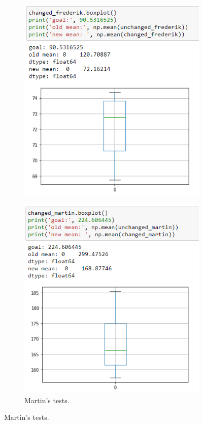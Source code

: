 \documentclass[parskip=full]{scrartcl}
\begin{document}
\begin{figure}[!hb]
\begin{subfigure}[b]{0.35\textwidth}
        \includegraphics[width=\textwidth]{frederik_changed.PNG}
    \end{subfigure}
    \begin{subfigure}[b]{0.35\textwidth}
        \caption{Martin's tests.}
        \includegraphics[width=\textwidth]{martin_changed.PNG}

\end{subfigure}
\end{figure}
\end{document}
